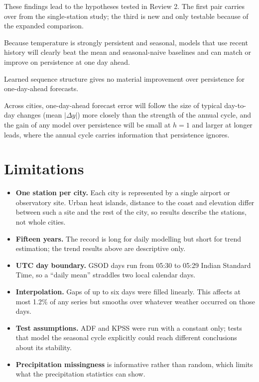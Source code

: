 \documentclass[11pt,a4paper]{article}
\begin{document}
These findings lead to the hypotheses tested in Review 2. The first pair carries over from the single-station study; the third is new and only testable because of the expanded comparison.
\begin{description}[style=nextline,leftmargin=1.2em]
  \item[H1] Because temperature is strongly persistent and seasonal, models that use recent history will clearly beat the mean and seasonal-naive baselines and can match or improve on persistence at one day ahead.
  \item[H0] Learned sequence structure gives no material improvement over persistence for one-day-ahead forecasts.
  \item[H2] Across cities, one-day-ahead forecast error will follow the size of typical day-to-day changes (mean $|\Delta y|$) more closely than the strength of the annual cycle, and the gain of any model over persistence will be small at $h = 1$ and larger at longer leads, where the annual cycle carries information that persistence ignores.
\end{description}

\section{Limitations}
\label{sec:limits}

\begin{itemize}
  \item \textbf{One station per city.} Each city is represented by a single airport or observatory site. Urban heat islands, distance to the coast and elevation differ between such a site and the rest of the city, so results describe the stations, not whole cities.
  \item \textbf{Fifteen years.} The record is long for daily modelling but short for trend estimation; the trend results above are descriptive only.
  \item \textbf{UTC day boundary.} GSOD days run from 05:30 to 05:29 Indian Standard Time, so a ``daily mean'' straddles two local calendar days.
  \item \textbf{Interpolation.} Gaps of up to six days were filled linearly. This affects at most 1.2\% of any series but smooths over whatever weather occurred on those days.
  \item \textbf{Test assumptions.} ADF and KPSS were run with a constant only; tests that model the seasonal cycle explicitly could reach different conclusions about its stability.
  \item \textbf{Precipitation missingness} is informative rather than random, which limits what the precipitation statistics can show.
\end{itemize}
\end{document}
